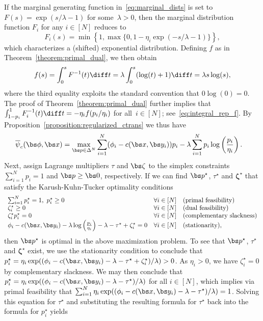 \documentclass[11pt, a4paper, oneside, reqno]{article}
\begin{document}
	\begin{example}
	If the marginal generating function in~\eqref{eq:marginal_dists} is set to $F(s) = \exp(s/\lambda - 1)$ for some~$\lambda>0$, then the marginal distribution function $F_i$ for any $i\in[N]$ reduces to 
	\[F_i(s) = \min\left\{1, \max\{0, 1 - \eta_i \exp(-s/\lambda - 1)\}  \right\},\]
	which characterizes a (shifted) exponential distribution. Defining $f$ as in Theorem~\ref{theorem:primal_dual}, we then obtain
	\begin{align*}
	    f(s)=\int_0^s F^{-1}(t)\diff t = \lambda \int_0^s (\log(t) + 1) \diff t = \lambda s\log(s),
	\end{align*}
	where the third equality exploits the standard convention that $0\log(0) = 0$. The proof of Theorem~\ref{theorem:primal_dual} further implies that $\int_{1-p_i}^1 F_i^{-1}(t) \diff t=-\eta_i f(p_i/\eta_i)$ for all~$i\in[N]$; see~\eqref{eq:integral_rep_f}. By Proposition~\ref{proposition:regularized_ctrans} we thus have
	\begin{align*}
	    \overline{\psi}_c(\bs \phi, \bs x) & = \max\limits_{\bs p \in \Delta^N} \sum\limits_{i=1}^N (\phi_i - c(\bs x, \bs y_i))p_i - \lambda \sum\limits_{i=1}^N p_i \log\left(\frac{p_i}{\eta_i}\right).
	\end{align*}
    Next, assign Lagrange multipliers $\tau$ and $\bs \zeta$ to the simplex constraints $\sum_{i=1}^N p_i=1$ and $\bs p\ge \bs 0$, respectively. 
    If we can find $\bs p^\star$, $\tau^\star$ and $\bm \zeta^\star$ that satisfy the Karush-Kuhn-Tucker optimality conditions 
	\begin{align*}
	    \begin{array}{lll}
	    \sum_{i=1}^N p^\star_i =1, ~p^\star_i \geq 0 & \forall i \in [N] & \text{(primal feasibility)}\\
	    \zeta^\star_i\geq 0 & \forall i \in [N] & \text{(dual feasibility)}\\ \zeta_i^\star p_i^\star=0 & \forall i \in [N] & \text{(complementary slackness)} \\
	    \phi_i - c(\bs x, \bs y_i) -\lambda \log\left(\frac{p_i}{\eta_i}\right) - \lambda - \tau^\star + \zeta^\star_i = 0 & \forall i \in [N] & \text{(stationarity)},
	    \end{array}
	\end{align*}
	then $\bs p^\star$ is optimal in the above maximization problem. To see that $\bs p^\star$, $\tau^\star$ and $\bm \zeta^\star$ exist, we use the stationarity condition to conclude that $p_i^\star = \eta_i \exp((\phi_i - c(\bs x, \bs y_i) - \lambda - \tau^\star + \zeta^\star_i) / \lambda)>0$. As $\eta_i > 0$, we have $\zeta_i^\star =0$ by complementary slackness. We may then conclude that $p_i^\star = \eta_i \exp((\phi_i - c(\bs x, \bs y_i)- \lambda - \tau^\star) / \lambda)$ for all $i \in [N]$, which implies via primal feasibility that $\sum_{i=1}^N \eta_i \exp((\phi_i - c(\bs x, \bs y_i) - \lambda - \tau^\star) / \lambda) = 1$. Solving this equation for $\tau^\star$ and substituting the resulting formula for $\tau^\star$ back into the formula for $p_i^\star$ yields

\end{example}
\end{document}
